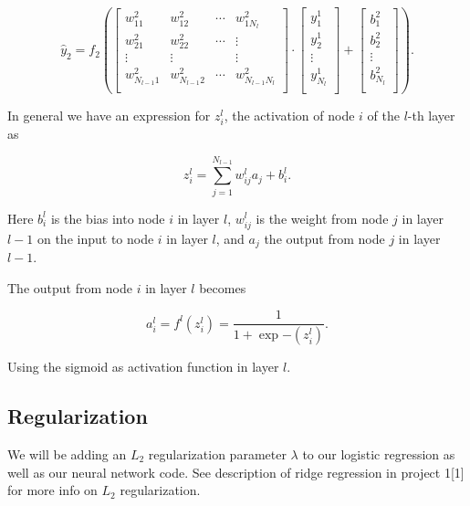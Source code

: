 \documentclass[11pt]{article}
\begin{document}
\begin{equation}
 \hat{y}_2 =  
 f_2\left(\left[\begin{array}{cccc}
    w^2_{11} &w^2_{12}  &\cdots &w^2_{1N_l} \\
    w^2_{21} &w^2_{22} &\cdots &\vdots \\
    \vdots   &\vdots   &       &\vdots \\
    w^2_{N_{l-1}1} &w^2_{N_{l-1}2} &\cdots &w^2_{N_{l-1}N_l} \\
    \end{array} \right] \cdot
    \left[\begin{array}{c}
           y^1_1 \\
           y^1_2 \\
           \vdots \\
           y^1_{N_l} \\
          \end{array}\right] + 
    \left[\begin{array}{c}
           b^2_1 \\
           b^2_2 \\
           \vdots \\
           b^2_{N_l} \\
          \end{array}\right]\right).
\end{equation}


    In general we have an expression for \(z_i^l\), the activation of node
\(i\) of the \(l\)-th layer as

\[
z_i^l = \sum_{j=1}^{N_{l-1}}w_{ij}^la_j+b_i^l.
\]

Here \(b_i^l\) is the bias into node \(i\) in layer \(l\), \(w_{ij}^l\)
is the weight from node \(j\) in layer \(l-1\) on the input to node
\(i\) in layer \(l\), and \(a_j\) the output from node \(j\) in layer
\(l-1\).

The output from node \(i\) in layer \(l\) becomes

\[
a_i^l = f^l(z_i^l) = \frac{1}{1+\exp{-(z_i^l)}}.
\]

Using the sigmoid as activation function in layer \(l\).

    \hypertarget{regularization}{%
\subsection{Regularization}\label{regularization}}

We will be adding an \(L_2\) regularization parameter \(\lambda\) to our
logistic regression as well as our neural network code. See description
of ridge regression in project 1{[}1{]} for more info on \(L_2\)
regularization.
\end{document}
